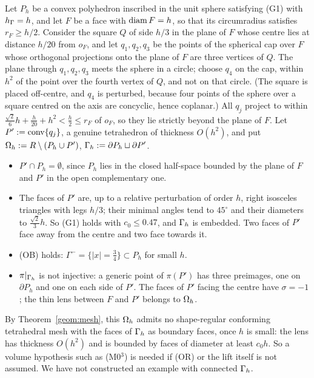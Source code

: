 \begin{example}\label{ex:sliver}
Let $P_h$ be a convex polyhedron inscribed in the unit sphere satisfying (G1) with $h_\Gamma=h$, and let $F$ be a face with $\operatorname{diam} F=h$, so that its circumradius satisfies $r_F\ge h/2$. Consider the square $Q$ of side $h/3$ in the plane of $F$ whose centre lies at distance $h/20$ from $o_F$, and let $q_1,q_2,q_3$ be the points of the spherical cap over $F$ whose orthogonal projections onto the plane of $F$ are three vertices of $Q$. The plane through $q_1,q_2,q_3$ meets the sphere in a circle; choose $q_4$ on the cap, within $h^2$ of the point over the fourth vertex of $Q$, and not on that circle. (The square is placed off-centre, and $q_4$ is perturbed, because four points of the sphere over a square centred on the axis are concyclic, hence coplanar.) All $q_j$ project to within $\frac{\sqrt2}6h+\frac h{20}+h^2<\frac h2\le r_F$ of $o_F$, so they lie strictly beyond the plane of $F$. Let $P':=\operatorname{conv}\{q_j\}$, a genuine tetrahedron of thickness $O(h^2)$, and put $\Omega_h:=R\setminus(P_h\cup P')$, $\Gamma_h:=\partial P_h\sqcup\partial P'$.
\begin{itemize}
\item $P'\cap P_h=\emptyset$, since $P_h$ lies in the closed half-space bounded by the plane of $F$ and $P'$ in the open complementary one.
\item The faces of $P'$ are, up to a relative perturbation of order $h$, right isosceles triangles with legs $h/3$; their minimal angles tend to $45^\circ$ and their diameters to $\frac{\sqrt2}3h$. So (G1) holds with $c_0\le0.47$, and $\Gamma_h$ is embedded. Two faces of $P'$ face away from the centre and two face towards it.
\item (OB) holds: $\Gamma^-=\{|x|=\frac34\}\subset P_h$ for small $h$.
\item $\pi|_{\Gamma_h}$ is not injective: a generic point of $\pi(P')$ has three preimages, one on $\partial P_h$ and one on each side of $P'$. The faces of $P'$ facing the centre have $\sigma=-1$; the thin lens between $F$ and $P'$ belongs to $\Omega_h$.
\end{itemize}
By Theorem~\ref{geom:mesh}, this $\Omega_h$ admits no shape-regular conforming tetrahedral mesh with the faces of $\Gamma_h$ as boundary faces, once $h$ is small: the lens has thickness $O(h^2)$ and is bounded by faces of diameter at least $c_0h$. So a volume hypothesis such as (M0$^3$) is needed if (OR) or the lift itself is not assumed. We have not constructed an example with connected $\Gamma_h$.
\end{example}

